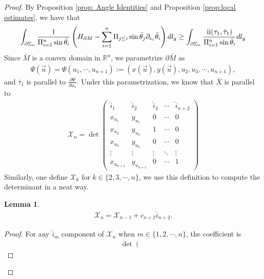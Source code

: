 \documentclass[11pt,letterpaper]{amsart}
\newcommand{\RN}[1]{%
  \textup{\uppercase\expandafter{\romannumeral#1}}%
}
\newtheorem{lem}{Lemma}[section]
\begin{document}
\begin{proof}
    By Proposition \ref{prop: Angle Identities} and Proposition \ref{prop:local estimates}, we have that
    \begin{align*}
        \int_{\partial\Sigma_n}\frac{1}{\Pi_{i=1}^n\sin\bar{\theta_i}}\left(H_{\partial M}-\sum_{i=1}^n\Pi_{j\leq i}\sin\bar{\theta}_j\partial_{\nu_i}\bar{\theta}_i\right)dl_g\geq \int_{\partial\Sigma_n}\frac{\RN{2}(\tau_1,\bar{\tau}_1)}{\Pi_{i=1}^n\sin\bar{\theta}_i}dl_g
        \end{align*}
        Since $\bar{M}$ is a convex domain in $\mathbb R^n$, we parametrize $\partial \bar{M}$ as 
        \begin{align}
            \Psi(\vec{u})=\Psi(u_1,\cdots, u_{n+1}):=(x(\vec{u}),y(\vec{u}),u_2,u_3,\cdots, u_{n+1}),
        \end{align}
        and $\bar{\tau}_1$ is parallel to $\frac{\partial\Psi}{\partial u_1}$.
        Under this parametrization, we know that $\bar{X}$ is parallel to
        \begin{align*}
           \mathcal{X}_n=\det \left(\begin{matrix}
                \hat{i}_1 & \hat{i}_2 & \hat{i}_3 &\cdots &\hat{i}_{n+2}\\
                x_{u_1} & y_{u_1} & 0 &\cdots & 0\\
                x_{u_2} & y_{u_2} & 1 & \cdots & 0\\
                x_{u_3} &y_{u_3} &0 &\cdots & 0\\
                \vdots  & \vdots & \vdots &\ddots & \vdots\\
                x_{u_{n+1}} & y_{u_{n+1}} & 0 &\cdots & 1 
            \end{matrix}\right)
        \end{align*}
        Similarly, one define $\mathcal{X}_k$ for $k\in\{2,3,\cdots, n\}$, we use this definition to compute the determinant in a neat way.
        \begin{lem}
            \begin{align}\label{normalvecinduction1}
                \mathcal{X}_{n}=\mathcal{X}_{n-1}+c_{n+2}\hat{i}_{n+2}.
            \end{align}
        \end{lem}
        \begin{proof}
            For any $\hat{i}_{m}$ component of $\mathcal{X}_n$ when $m\in\{1,2,\cdots, n\}$, the coefficient is 
            \begin{align*}
                \det\left(\begin{matrix}

\end{matrix}
\end{align*}
\end{proof}
\end{proof}
\end{document}
